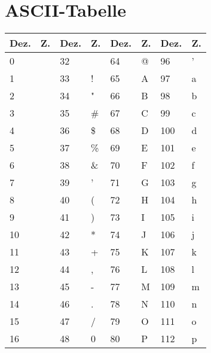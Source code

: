 \section{ASCII-Tabelle}\label{sec:ascii-tabelle}
\begin{table}[!h]
    \centering
    \begin{tabular}{|p{1.0cm}|p{1.0cm}||p{1.0cm}|p{1.0cm}||p{1.0cm}|p{1.0cm}||p{1.0cm}|p{1.0cm}|}
    \hline
    \textbf{Dez.} & \textbf{Z.} & \textbf{Dez.} & \textbf{Z.} & \textbf{Dez.} & \textbf{Z.} & \textbf{Dez.} & \textbf{Z.} \\ \hline\hline
    0    & ~       & 32   & ~       & 64   & @       & 96   & '       \\ \hline
    1    & ~       & 33   & !       & 65   & A       & 97   & a       \\ \hline
    2    & ~       & 34   & "       & 66   & B       & 98   & b       \\ \hline
    3    & ~       & 35   & \#      & 67   & C       & 99   & c       \\ \hline
    4    & ~       & 36   & \$      & 68   & D       & 100  & d       \\ \hline
    5    & ~       & 37   & \%      & 69   & E       & 101  & e       \\ \hline
    6    & ~       & 38   & \&      & 70   & F       & 102  & f       \\ \hline
    7    & ~       & 39   & '       & 71   & G       & 103  & g       \\ \hline
    8    & ~       & 40   & (       & 72   & H       & 104  & h       \\ \hline
    9    & ~       & 41   & )       & 73   & I       & 105  & i       \\ \hline
    10   & ~       & 42   & *       & 74   & J       & 106  & j       \\ \hline
    11   & ~       & 43   & +       & 75   & K       & 107  & k       \\ \hline
    12   & ~       & 44   & ,       & 76   & L       & 108  & l       \\ \hline
    13   & ~       & 45   & -       & 77   & M       & 109  & m       \\ \hline
    14   & ~       & 46   & .       & 78   & N       & 110  & n       \\ \hline
    15   & ~       & 47   & /       & 79   & O       & 111  & o       \\ \hline
    16   & ~       & 48   & 0       & 80   & P       & 112  & p       \\ \hline

\end{tabular}
\end{table}
